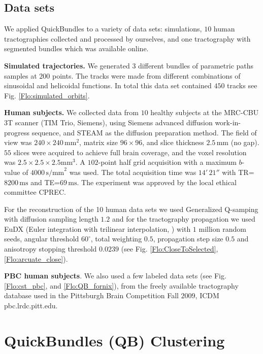 \documentclass[preprint,authoryear,a4paper,10pt,onecolumn]{elsarticle}
\begin{document}
\subsection{\label{sub:QB-Data-sets}Data sets}

We applied QuickBundles to a variety of data sets: simulations, $10$ human
tractographies collected and processed by ourselves, and one tractography
with segmented bundles which was available online.

\textbf{Simulated trajectories.} We generated $3$ different bundles of
parametric paths samples at $200$ points. The tracks were made from
different combinations of sinusoidal and helicoidal functions.  In total
this data set contained $450$ tracks see Fig. \ref{Flo:simulated_orbits}.

\textbf{Human subjects. } We collected data from $10$ healthy subjects at
the MRC-CBU 3T scanner (TIM Trio, Siemens), using Siemens advanced
diffusion work-in-progress sequence, and STEAM
\citep{merboldt1992diffusion,MAB04} as the diffusion preparation
method. The field of view was $240\times240\,\textrm{mm}^{2}$, matrix size
$96\times96$, and slice thickness $2.5\,\textrm{mm}$ (no gap).  $55$ slices were
acquired to achieve full brain coverage, and the voxel resolution was
$2.5\times2.5\times2.5\textrm{mm}^{3}$. A $102$-point half grid
acquisition \citep{Yeh2010} with a maximum $b$-value of $4000\, \textrm{s/mm}^{2}$
was used. The total acquisition time was $14'\,21''$ with
TR=$8200\,\textrm{ms}$ and TE=$69\,\textrm{ms}$. The experiment was approved
by the local ethical committee CPREC.

For the reconstruction of the 10 human data sets we used Generalized
Q-samping \citep{Garyfallidis_thesis} with diffusion sampling length
$1.2$ and for the tractography propagation we used EuDX (Euler
integration with trilinear interpolation, \citet{Garyfallidis_thesis})
with $1$ million random seeds, angular threshold $60^{\circ}$, total
weighting $0.5$, propagation step size $0.5$ and anisotropy stopping
threshold $0.0239$ (see Fig. \ref{Flo:CloseToSelected},
\ref{Flo:arcuate_close}).

\textbf{PBC human subjects}. We also used a few labeled data sets (see
Fig. \ref{Flo:cst_pbc}, and \ref{Flo:QB_fornix}), from the freely available
tractography database used in the Pittsburgh Brain Competition Fall
$2009$, ICDM pbc.lrdc.pitt.edu.

\section{QuickBundles (QB) Clustering}
\end{document}
